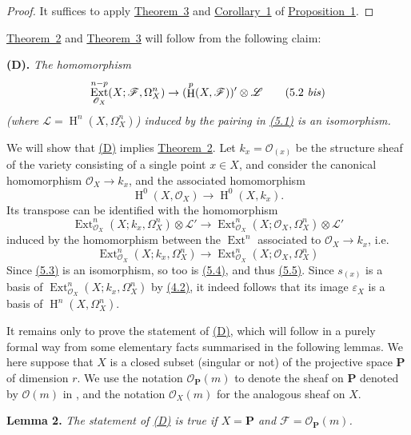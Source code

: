 \documentclass{article}
\newenvironment{itenv}[1]
  {\phantomsection\par\medskip\noindent\textbf{#1.}\itshape}
  {\medskip}
\newcommand{\scr}[1]{{\mathscr{#1}}}
\newcommand{\bb}{\mathbf}
\DeclareMathOperator{\Ext}{Ext}
\DeclareMathOperator{\HH}{H}
\newcommand{\oldpage}[1]{\marginpar{\footnotesize$\Big\vert$ \textit{p.~#1}}}
\begin{document}
\begin{proof}
  It suffices to apply \hyperref[theorem3]{Theorem~3} and \hyperref[proposition1corollary1]{Corollary~1} of \hyperref[proposition1]{Proposition~1}.
\end{proof}

\hyperref[theorem2]{Theorem~2} and \hyperref[theorem3]{Theorem~3} will follow from the following claim:

\begin{itenv}{(D)}
\label{(D)}
  The homomorphism
  \[
  \label{5.2bis}
    \Ext_{\scr{O}_X}^{n-p}(X;\scr{F},\Omega_X^n) \to (\HH^p(X,\scr{F}))'\otimes\scr{L}
  \tag{5.2 \emph{bis}}
  \]
  (where $\scr{L}=\HH^n(X,\Omega_X^n)$) induced by the pairing in \hyperref[5.1]{(5.1)} is an isomorphism.
\end{itenv}

We will show that \hyperref[(D)]{(D)} implies \hyperref[theorem2]{Theorem~2}.
Let $k_x=\scr{O}_{(x)}$ be the structure sheaf of the variety consisting of a single point $x\in X$, and consider the canonical homomorphism $\scr{O}_X\to k_x$, and the associated homomorphism
\[
\label{5.3}
  \HH^0(X,\scr{O}_X) \to \HH^0(X,k_x).
\tag{5.3}
\]
Its transpose can be identified with the homomorphism
\[
\label{5.4}
  \Ext_{\scr{O}_X}^n(X;k_x,\Omega_X^n)\otimes\scr{L}' \to \Ext_{\scr{O}_X}^n(X;\scr{O}_X,\Omega_X^n)\otimes\scr{L}'
\tag{5.4}
\]
induced by the homomorphism between the $\Ext^n$ associated to $\scr{O}_X\to k_x$, i.e.
\[
\label{5.5}
  \Ext_{\scr{O}_X}^n(X;k_x,\Omega_X^n) \to \Ext_{\scr{O}_X}^n(X;\scr{O}_X,\Omega_X^n)
\tag{5.5}
\]
\oldpage{149-15}
Since \hyperref[5.3]{(5.3)} is an isomorphism, so too is \hyperref[5.4]{(5.4)}, and thus \hyperref[5.5]{(5.5)}.
Since $s_{(x)}$ is a basis of $\Ext_{\scr{O}_X}^n(X;k_x,\Omega_X^n)$ by \hyperref[4.2]{(4.2)}, it indeed follows that its image $\varepsilon_X$ is a basis of $\HH^n(X,\Omega_X^n)$.

It remains only to prove the statement of \hyperref[(D)]{(D)}, which will follow in a purely formal way from some elementary facts summarised in the following lemmas.
We here suppose that $X$ is a closed subset (singular or not) of the projective space $\bb{P}$ of dimension $r$.
We use the notation $\scr{O}_\bb{P}(m)$ to denote the sheaf on $\bb{P}$ denoted by $\scr{O}(m)$ in \cite{3}, and the notation $\scr{O}_X(m)$ for the analogous sheaf on $X$.

\begin{itenv}{Lemma 2}
\label{lemma2}
  The statement of \hyperref[(D)]{(D)} is true if $X=\bb{P}$ and $\scr{F}=\scr{O}_\bb{P}(m)$.
\end{itenv}
\end{document}

